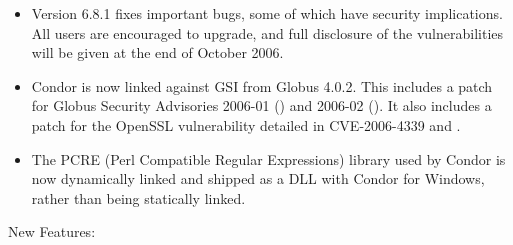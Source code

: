 \begin{itemize}

\item Version 6.8.1 fixes important bugs, some of which have
security implications.  All users are encouraged to upgrade, and full
disclosure of the vulnerabilities will be given at the end of October 2006.

\item Condor is now linked against GSI from Globus 4.0.2. This includes
a patch for Globus Security Advisories 2006-01 
()
and 2006-02 
().
It also includes a
patch for the OpenSSL vulnerability detailed in CVE-2006-4339 and
.

\item The PCRE (Perl Compatible Regular Expressions) library used by
Condor is now dynamically linked and shipped as a DLL with Condor for
Windows, rather than being statically linked.

\end{itemize}


\noindent New Features:


